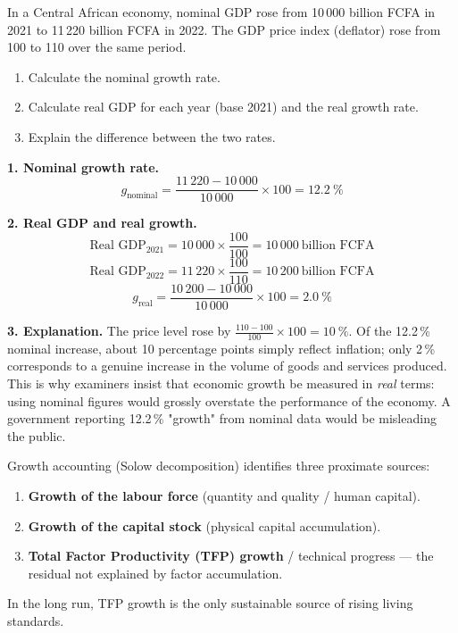 \documentclass[11pt]{article}
\newcommand{\cle}[1]{{\popxbold\color{popdark}#1}}
\begin{document}
\begin{exoresolu}
In a Central African economy, nominal GDP rose from 10\,000 billion FCFA in 2021 to 11\,220 billion FCFA in 2022. The GDP price index (deflator) rose from 100 to 110 over the same period.
\begin{enumerate}
\item Calculate the nominal growth rate.
\item Calculate real GDP for each year (base 2021) and the real growth rate.
\item Explain the difference between the two rates.
\end{enumerate}
\tcblower
\textbf{1. Nominal growth rate.}
\[ g_{\text{nominal}} = \frac{11\,220 - 10\,000}{10\,000} \times 100 = 12.2\ \% \]

\textbf{2. Real GDP and real growth.}
\[ \text{Real GDP}_{2021} = 10\,000 \times \frac{100}{100} = 10\,000 \ \text{billion FCFA} \]
\[ \text{Real GDP}_{2022} = 11\,220 \times \frac{100}{110} = 10\,200 \ \text{billion FCFA} \]
\[ g_{\text{real}} = \frac{10\,200 - 10\,000}{10\,000} \times 100 = 2.0\ \% \]

\textbf{3. Explanation.} The price level rose by $\frac{110-100}{100}\times 100 = 10\ \%$. Of the 12.2\,\% nominal increase, about 10 percentage points simply reflect \cle{inflation}; only 2\,\% corresponds to a genuine increase in the volume of goods and services produced. This is why examiners insist that economic growth be measured in \emph{real} terms: using nominal figures would grossly overstate the performance of the economy. A government reporting 12.2\,\% "growth" from nominal data would be misleading the public.
\end{exoresolu}

\begin{aretenir}
Growth accounting (Solow decomposition) identifies three proximate sources:
\begin{enumerate}
\item \textbf{Growth of the labour force} (quantity and quality / human capital).
\item \textbf{Growth of the capital stock} (physical capital accumulation).
\item \textbf{Total Factor Productivity (TFP) growth} / technical progress — the residual not explained by factor accumulation.
\end{enumerate}
In the long run, TFP growth is the only sustainable source of rising living standards.
\end{aretenir}
\end{document}
